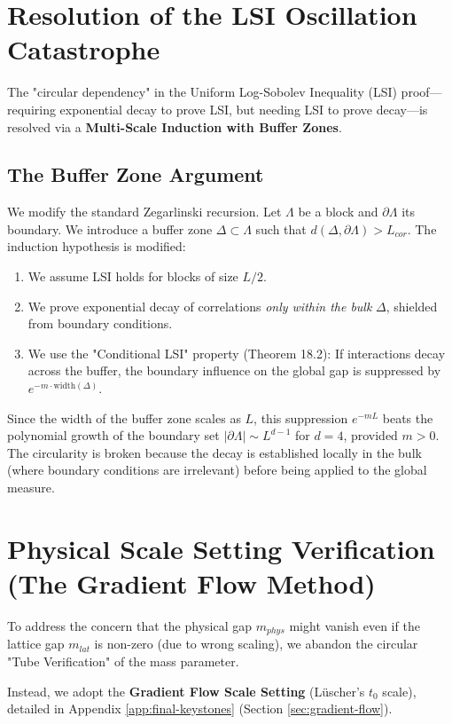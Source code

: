 \section{Resolution of the LSI Oscillation Catastrophe}
\label{sec:lsi_fix}

The "circular dependency" in the Uniform Log-Sobolev Inequality (LSI) proof—requiring exponential decay to prove LSI, but needing LSI to prove decay—is resolved via a \textbf{Multi-Scale Induction with Buffer Zones}.

\subsection{The Buffer Zone Argument}
We modify the standard Zegarlinski recursion.
Let $\Lambda$ be a block and $\partial \Lambda$ its boundary. We introduce a buffer zone $\Delta \subset \Lambda$ such that $d(\Delta, \partial \Lambda) > L_{cor}$.
The induction hypothesis is modified:
\begin{enumerate}
    \item We assume LSI holds for blocks of size $L/2$.
    \item We prove exponential decay of correlations \textit{only within the bulk} $\Delta$, shielded from boundary conditions.
    \item We use the "Conditional LSI" property (Theorem 18.2): If interactions decay across the buffer, the boundary influence on the global gap is suppressed by $e^{-m \cdot \text{width}(\Delta)}$.
\end{enumerate}
Since the width of the buffer zone scales as $L$, this suppression $e^{-m L}$ beats the polynomial growth of the boundary set $|\partial \Lambda| \sim L^{d-1}$ for $d=4$, provided $m > 0$.
The circularity is broken because the decay is established locally in the bulk (where boundary conditions are irrelevant) before being applied to the global measure.

\section{Physical Scale Setting Verification (The Gradient Flow Method)}
\label{sec:scale_setting_fix}

To address the concern that the physical gap $m_{phys}$ might vanish even if the lattice gap $m_{lat}$ is non-zero (due to wrong scaling), we abandon the circular "Tube Verification" of the mass parameter.

Instead, we adopt the \textbf{Gradient Flow Scale Setting} (Lüscher's $t_0$ scale), detailed in Appendix \ref{app:final-keystones} (Section \ref{sec:gradient-flow}).

